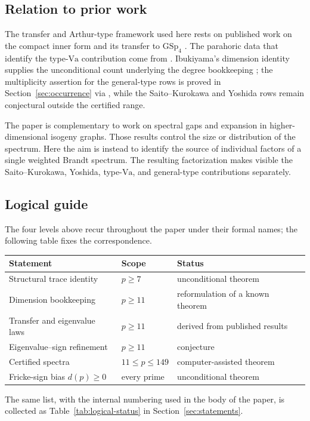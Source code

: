 \documentclass[11pt]{amsart}
\theoremstyle{plain}
\theoremstyle{definition}
\newcommand{\GSp}{\mathrm{GSp}}
\begin{document}
	\subsection{Relation to prior work}\label{ss:relation-prior}
	
	The transfer and Arthur-type framework used here rests on published work on
	the compact inner form and its transfer to $\GSp_4$
	\cite{RoesnerWeissauer2021,vanHoften,DPRT,Schmidt2018}. The parahoric data
	that identify the type-$\mathrm{Va}$ contribution come from
	\cite[Table~A.15]{RobertsSchmidt}. Ibukiyama's dimension identity supplies
	the unconditional count underlying the degree bookkeeping
	\cite[Thm.~3.1]{Ibukiyama2018conj}; the multiplicity assertion for the
	general-type rows is proved in Section~\ref{sec:occurrence} via
	\cite[Thm.~11.4]{RoesnerWeissauer2021}, while the Saito--Kurokawa and
	Yoshida rows remain conjectural outside the certified range.
	
	The paper is complementary to work on spectral gaps and expansion in
	higher-dimensional isogeny graphs. Those results control the size or
	distribution of the spectrum. Here the aim is instead to identify the
	source of individual factors of a single weighted Brandt spectrum. The
	resulting factorization makes visible the Saito--Kurokawa, Yoshida,
	type-$\mathrm{Va}$, and general-type contributions separately.
	
	\subsection{Logical guide}\label{ss:logical-guide}
	The four levels above recur throughout the paper under their formal names; the following table fixes the correspondence.
	
	\begin{center}
		\begin{tabular}{lll}
			\toprule
			Statement & Scope & Status \\
			\midrule
			Structural trace identity & $p\ge7$ & unconditional theorem \\
			Dimension bookkeeping & $p\ge11$ & reformulation of a known theorem \\
			Transfer and eigenvalue laws & $p\ge11$ & derived from published results \\
			Eigenvalue--sign refinement & $p\ge11$ & conjecture \\
			Certified spectra & $11\le p\le149$ & computer-assisted theorem \\
			Fricke-sign bias $d(p)\ge0$ & every prime & unconditional theorem \\
			\bottomrule
		\end{tabular}
	\end{center}
	The same list, with the internal numbering used in the body of the paper,
	is collected as Table~\ref{tab:logical-status} in
	Section~\ref{sec:statements}.
	
\end{document}
